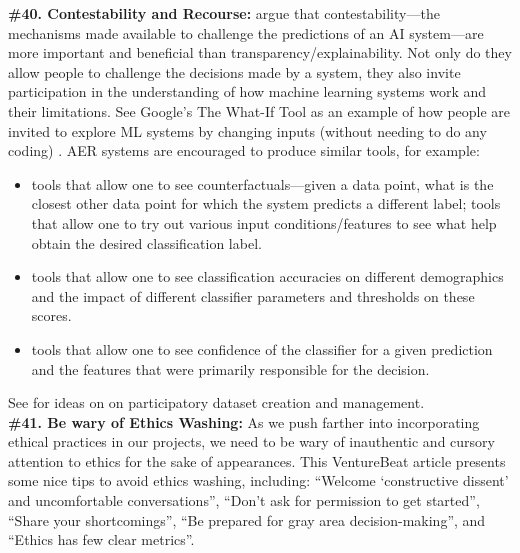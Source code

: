 \documentclass{clv3}
\begin{document}
\noindent \textbf{\#40. Contestability and Recourse:} \citet{mulligan2019shaping} argue that contestability---the mechanisms made available to challenge the predictions of an AI system---are more important and beneficial than transparency/explainability. Not only do they allow people to challenge the decisions made by a system, they also invite participation in the understanding of how machine learning systems work and their limitations. See Google’s The What-If Tool as an example of how people are invited to explore ML systems by changing inputs (without needing to do any coding) \cite{what_if_2018}.
AER systems are encouraged to produce similar tools, for example:\\[-20pt]
\begin{itemize}
    \item tools that allow one to see counterfactuals—given a data point, what is the closest other data point for which the system predicts a different label; tools that allow one to try out various input conditions/features to see what help obtain the desired classification label. 
\vspace*{-1mm}
    \item tools that allow one to see classification accuracies on different demographics and the impact of different classifier parameters and thresholds on these scores.
\vspace*{-1mm}
    \item tools that allow one to see confidence of the classifier for a given prediction and the features that were primarily responsible for the decision.
\end{itemize}
\vspace*{-3mm}
\noindent See \citet{denton2020bringing} for ideas on on participatory dataset creation and management.\\

\noindent \textbf{\#41. Be wary of Ethics Washing:} As we push farther into incorporating ethical practices in our projects, we need to be wary of inauthentic and cursory attention to ethics for the sake of appearances. This VentureBeat article \cite{johnson_2019} presents some nice tips to avoid ethics washing, including: “Welcome ‘constructive dissent’ and uncomfortable conversations”, “Don’t ask for permission to get started”, “Share your shortcomings”, “Be prepared for gray area decision-making”, and “Ethics has few clear metrics”.
\end{document}
